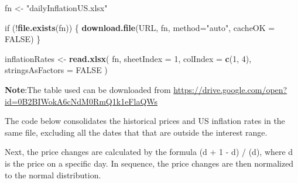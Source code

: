\documentclass[english,man]{apa6}
\newenvironment{Shaded}{\begin{snugshade}}{\end{snugshade}}
\newcommand{\KeywordTok}[1]{\textcolor[rgb]{0.13,0.29,0.53}{\textbf{{#1}}}}
\newcommand{\DataTypeTok}[1]{\textcolor[rgb]{0.13,0.29,0.53}{{#1}}}
\newcommand{\DecValTok}[1]{\textcolor[rgb]{0.00,0.00,0.81}{{#1}}}
\newcommand{\StringTok}[1]{\textcolor[rgb]{0.31,0.60,0.02}{{#1}}}
\newcommand{\OtherTok}[1]{\textcolor[rgb]{0.56,0.35,0.01}{{#1}}}
\newcommand{\NormalTok}[1]{{#1}}
\begin{document}
\begin{Shaded}
\begin{Highlighting}[]
\NormalTok{fn <-}\StringTok{ "dailyInflationUS.xlsx"}
  
\NormalTok{if (!}\KeywordTok{file.exists}\NormalTok{(fn)) \{}
  \KeywordTok{download.file}\NormalTok{(URL, fn, }\DataTypeTok{method=}\StringTok{"auto"}\NormalTok{, }\DataTypeTok{cacheOK =} \OtherTok{FALSE}\NormalTok{)}
  \NormalTok{\}}
  
\NormalTok{inflationRates <-}
\StringTok{  }\KeywordTok{read.xlsx}\NormalTok{(}
  \NormalTok{fn,}
  \DataTypeTok{sheetIndex =} \DecValTok{1}\NormalTok{,}
  \DataTypeTok{colIndex =} \KeywordTok{c}\NormalTok{(}\DecValTok{1}\NormalTok{, }\DecValTok{4}\NormalTok{),}
  \DataTypeTok{stringsAsFactors =} \OtherTok{FALSE}
  \NormalTok{)}
\end{Highlighting}
\end{Shaded}

\textbf{Note}:The table used can be downloaded from
\url{https://drive.google.com/open?id=0B2BIWokA6cNdM0RmQ1k1eFlaQWs}

The code below consolidates the historical prices and US inflation rates
in the same file, excluding all the dates that that are outside the
interest range.

\begin{Shaded}
\end{Shaded}

Next, the price changes are calculated by the formula (d + 1 - d) / (d),
where d is the price on a specific day. In sequence, the price changes
are then normalized to the normal distribution.
\end{document}
